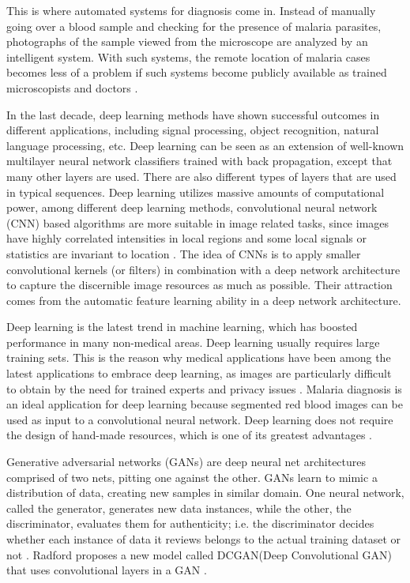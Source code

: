 This is where automated systems for diagnosis
come in. Instead of manually going over a blood sample and
checking for the presence of malaria parasites, photographs
of the sample viewed from the microscope are analyzed by
an intelligent system. With such systems, the remote location
of malaria cases becomes less of a problem if such systems
become publicly available as trained microscopists and doctors \cite{Premaratne2006AFilms}\cite{Penas2017}.

 

In the last decade, deep learning  methods have shown successful outcomes in different applications, including signal processing, object recognition, natural language processing, etc. Deep learning can be seen as an extension of well-known multilayer neural network classifiers trained with back propagation, except that many other layers are used. There are also different types of layers that are used in typical sequences. Deep learning utilizes massive amounts of computational power, among different deep learning methods, convolutional neural network (CNN) based algorithms are more suitable in image related tasks, since images have highly correlated intensities in local regions and some local signals or statistics are invariant to location \cite{Yan2017Multi-InstanceRecognition}. The idea of CNNs is to apply smaller convolutional kernels (or filters) in combination with a deep network architecture to capture the discernible image resources as much as possible. Their attraction comes from the automatic feature learning ability in a deep network architecture. 

Deep learning is the latest trend in machine learning, which has boosted performance in many non-medical areas. Deep learning usually requires large training sets. This is the reason why medical applications have been among the latest applications to embrace deep learning, as images are particularly difficult to obtain by the need for trained experts and privacy issues \cite{Dong2017a}. Malaria diagnosis is an ideal application for deep learning because segmented red blood images can be used as input to a convolutional neural network. Deep learning does not require the design of hand-made resources, which is one of its greatest advantages \cite{Liang2017}.

Generative adversarial networks (GANs) are deep neural net architectures comprised of two nets, pitting one against the other. GANs learn to mimic a distribution of data,  creating new samples in similar  domain. One neural network, called the generator, generates new data instances, while the other, the discriminator, evaluates them for authenticity; i.e. the discriminator decides whether each instance of data it reviews belongs to the actual training dataset or not  \cite{Goodfellow2014}.  Radford proposes a new  model called DCGAN(Deep Convolutional GAN) that uses convolutional layers in a GAN \cite{Radford2015UnsupervisedNetworks}.


